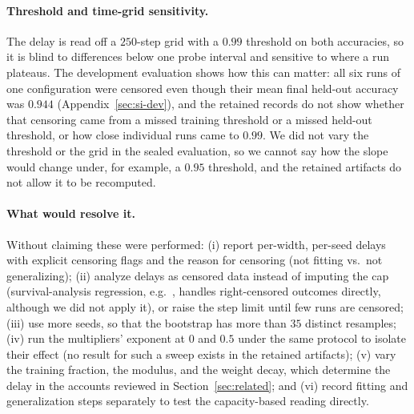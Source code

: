 \documentclass{article}
\begin{document}
\paragraph{Threshold and time-grid sensitivity.} The delay is read off a $250$-step grid with a $0.99$ threshold on both accuracies, so it is blind to differences below one probe interval and sensitive to where a run plateaus. The development evaluation shows how this can matter: all six runs of one configuration were censored even though their mean final held-out accuracy was $0.944$ (Appendix~\ref{sec:si-dev}), and the retained records do not show whether that censoring came from a missed training threshold or a missed held-out threshold, or how close individual runs came to $0.99$. We did not vary the threshold or the grid in the sealed evaluation, so we cannot say how the slope would change under, for example, a $0.95$ threshold, and the retained artifacts do not allow it to be recomputed.

\paragraph{What would resolve it.} Without claiming these were performed: (i) report per-width, per-seed delays with explicit censoring flags and the reason for censoring (not fitting vs.\ not generalizing); (ii) analyze delays as censored data instead of imputing the cap (survival-analysis regression, e.g.\ \citealp{Cox1972RegressionMA}, handles right-censored outcomes directly, although we did not apply it), or raise the step limit until few runs are censored; (iii) use more seeds, so that the bootstrap has more than $35$ distinct resamples; (iv) run the multipliers' exponent at $0$ and $0.5$ under the same protocol to isolate their effect (no result for such a sweep exists in the retained artifacts); (v) vary the training fraction, the modulus, and the weight decay, which determine the delay in the accounts reviewed in Section~\ref{sec:related}; and (vi) record fitting and generalization steps separately to test the capacity-based reading directly.
\end{document}
